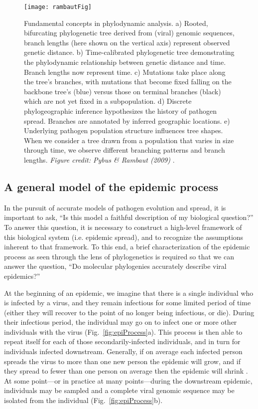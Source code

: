 \begin{figure}[ht]
  \centering
  \texttt{[image: rambautFig]}
  \caption[Applications of phylodynamics]{Fundamental concepts in phylodynamic analysis. a) Rooted, bifurcating phylogenetic tree derived from (viral) genomic sequences, branch lengths (here shown on the vertical axis) represent observed genetic distance. b) Time-calibrated phylogenetic tree demonstrating the phylodynamic relationship between genetic distance and time. Branch lengths now represent time. c) Mutations take place along the tree's branches, with mutations that become fixed falling on the backbone tree's (blue) versus those on terminal branches (black) which are not yet fixed in a subpopulation. d) Discrete phylogeographic inference hypothesizes the history of pathogen spread. Branches are annotated by inferred geographic locations. e) Underlying pathogen population structure influences tree shapes. When we consider a tree drawn from a population that varies in size through time, we observe different branching patterns and branch lengths.
  \textit{Figure credit: Pybus \& Rambaut (2009)} \citep{pybus2009evolutionary}.
  }
  \label{fig:phylogeneticsOverview}
\end{figure}

\subsection{A general model of the epidemic process}
In the pursuit of accurate models of pathogen evolution and spread, it is important to ask, ``Is this model a faithful description of my biological question?''
To answer this question, it is necessary to construct a high-level framework of this biological system (i.e. epidemic spread), and to recognize the assumptions inherent to that framework.
To this end, a brief characterization of the epidemic process as seen through the lens of phylogenetics is required so that we can answer the question, ``Do molecular phylogenies accurately describe viral epidemics?''

At the beginning of an epidemic, we imagine that there is a single individual who is infected by a virus, and they remain infectious for some limited period of time (either they will recover to the point of no longer being infectious, or die).
During their infectious period, the individual may go on to infect one or more other individuals with the virus (Fig.~\ref{fig:epiProcess}a).
This process is then able to repeat itself for each of those secondarily-infected individuals, and in turn for individuals infected downstream.
Generally, if on average each infected person spreads the virus to more than one new person the epidemic will grow, and if they spread to fewer than one person on average then the epidemic will shrink \citep{dietz1993estimation}.
At some point---or in practice at many points---during the downstream epidemic, individuals may be sampled and a complete viral genomic sequence may be isolated from the individual (Fig.~\ref{fig:epiProcess}b).

